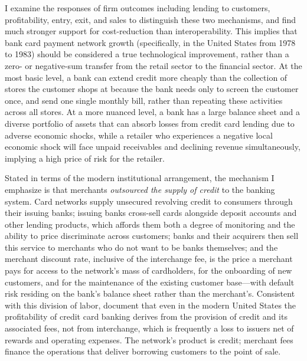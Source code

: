 \documentclass[12pt,english]{article}
\begin{document}
I examine the responses of firm outcomes including lending to customers, profitability, entry, exit, and sales to distinguish these two mechanisms, and find much stronger support for cost-reduction than interoperability. This implies that bank card payment network growth (specifically, in the United States from 1978 to 1983) should be considered a true technological improvement, rather than a zero- or negative-sum transfer from the retail sector to the financial sector. At the most basic level, a bank can extend credit more cheaply than the collection of stores the customer shops at because the bank needs only to screen the customer once, and send one single monthly bill, rather than repeating these activities across all stores. At a more nuanced level, a bank has a large balance sheet and a diverse portfolio of assets that can absorb losses from credit card lending due to adverse economic shocks, while a retailer who experiences a negative local economic shock will face unpaid receivables and declining revenue simultaneously, implying a high price of risk for the retailer.

Stated in terms of the modern institutional arrangement, the mechanism I emphasize is that merchants \emph{outsourced the supply of credit} to the banking system. Card networks supply unsecured revolving credit to consumers through their issuing banks; issuing banks cross-sell cards alongside deposit accounts and other lending products, which affords them both a degree of monitoring and the ability to price discriminate across customers; banks and their acquirers then sell this service to merchants who do not want to be banks themselves; and the merchant discount rate, inclusive of the interchange fee, is the price a merchant pays for access to the network's mass of cardholders, for the onboarding of new customers, and for the maintenance of the existing customer base---with default risk residing on the bank's balance sheet rather than the merchant's. Consistent with this division of labor, \cite{adams_credit_2022} document that even in the modern United States the profitability of credit card banking derives from the provision of credit and its associated fees, not from interchange, which is frequently a loss to issuers net of rewards and operating expenses. The network's product is credit; merchant fees finance the operations that deliver borrowing customers to the point of sale.
\end{document}
